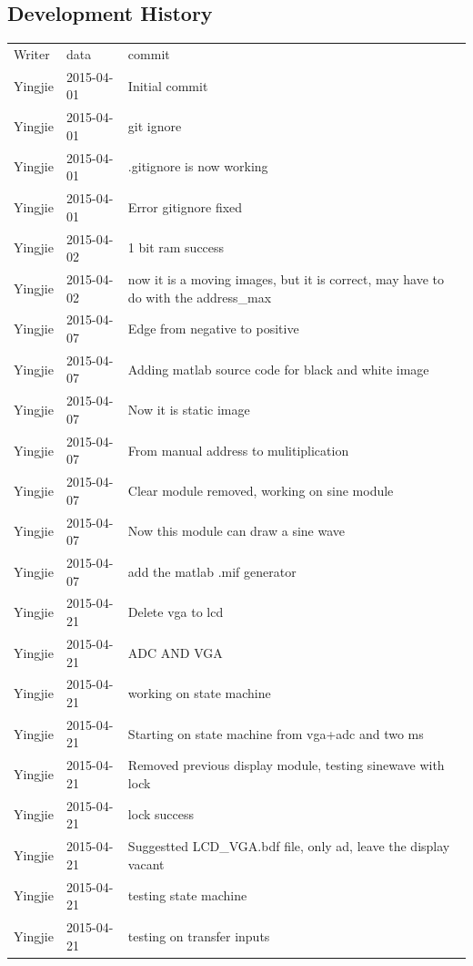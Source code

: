 \documentclass[11pt]{scrartcl}
\begin{document}
\subsection{Development History}
\begin{longtable}{@{\extracolsep{\fill}}lll@{}}
Writer & data & commit \\
Yingjie & 2015-04-01 & Initial commit \\ \hline
Yingjie & 2015-04-01 & git ignore \\ \hline
Yingjie & 2015-04-01 & .gitignore is now working \\ \hline
Yingjie & 2015-04-01 & Error gitignore fixed \\ \hline
Yingjie & 2015-04-02 & 1 bit ram success \\ \hline
Yingjie & 2015-04-02 & now it is a moving images, but it is correct, may have to do with the address\_max \\ \hline
Yingjie & 2015-04-07 & Edge from negative to positive \\ \hline
Yingjie & 2015-04-07 & Adding matlab source code for black and white image \\ \hline
Yingjie & 2015-04-07 & Now it is static image \\ \hline
Yingjie & 2015-04-07 & From manual address to mulitiplication \\ \hline
Yingjie & 2015-04-07 & Clear module removed, working on sine module \\ \hline
Yingjie & 2015-04-07 & Now this module can draw a sine wave \\ \hline
Yingjie & 2015-04-07 & add the matlab .mif generator \\ \hline
Yingjie & 2015-04-21 & Delete vga to lcd \\ \hline
Yingjie & 2015-04-21 & ADC AND VGA \\ \hline
Yingjie & 2015-04-21 & working on state machine \\ \hline
Yingjie & 2015-04-21 & Starting on state machine from vga+adc and two ms \\ \hline
Yingjie & 2015-04-21 & Removed previous display module, testing sinewave with lock \\ \hline
Yingjie & 2015-04-21 & lock success \\ \hline
Yingjie & 2015-04-21 & Suggestted LCD\_VGA.bdf file, only ad, leave the display vacant \\ \hline
Yingjie & 2015-04-21 & testing state machine \\ \hline
Yingjie & 2015-04-21 & testing on transfer inputs \\ \hline

\end{longtable}
\end{document}
